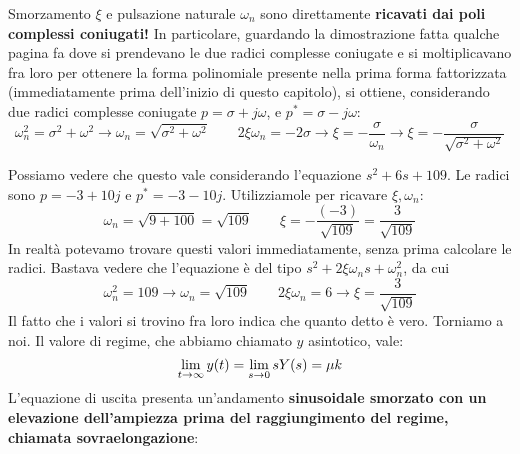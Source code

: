 \begin{defin}{}{}
Smorzamento $\xi$ e pulsazione naturale $\omega_n$ sono direttamente \textbf{ricavati dai poli complessi coniugati!} In particolare, guardando la dimostrazione fatta qualche pagina fa dove si prendevano le due radici complesse coniugate e si moltiplicavano fra loro per ottenere la forma polinomiale presente nella prima forma fattorizzata (immediatamente prima dell'inizio di questo capitolo), si ottiene, considerando due radici complesse coniugate $p = \sigma + j\omega$, e $p^* = \sigma - j\omega$: 
\begin{equation}
 \omega_n^2 = \sigma^2 + \omega^2 \rightarrow \boxed{\omega_n = \sqrt{\sigma^2 + \omega^2}} \quad \quad 2\xi \omega_{n} = -2\sigma \rightarrow \xi = -\frac{\sigma}{\omega_n} \rightarrow \boxed{\xi = -\frac{\sigma}{\sqrt{\sigma^2+\omega^2}}}
\end{equation}
\end{defin}
Possiamo vedere che questo vale considerando l'equazione $s^2 + 6s + 109$. Le radici sono $p = -3 + 10j$ e $p^* = -3 -10 j$. Utilizziamole per ricavare $\xi, \omega_n$:
\begin{equation*}
\omega_n = \sqrt{9+100} = \sqrt{109} \quad \quad \xi = -\frac{(-3)}{\sqrt{109}} = \frac{3}{\sqrt{109}}
\end{equation*}
In realtà potevamo trovare questi valori immediatamente, senza prima calcolare le radici. Bastava vedere che l'equazione è del tipo $s^2 + 2\xi\omega_n s + \omega_n^2$, da cui
\begin{equation*}
\omega_n^2 = 109 \rightarrow \omega_n = \sqrt{109} \quad \quad 2\xi\omega_n = 6 \rightarrow \xi = \frac{3}{\sqrt{109}}
\end{equation*}
Il fatto che i valori si trovino fra loro indica che quanto detto è vero.
\starbreak
Torniamo a noi.
Il valore di regime, che abbiamo chiamato $y$ asintotico, vale:
\begin{equation}
\lim_{t \rightarrow \infty} y(t) = \lim_{s \rightarrow 0} sY(s) = \mu k
\end{equation}
L'equazione di uscita presenta un'andamento \textbf{sinusoidale smorzato con un elevazione dell'ampiezza prima del raggiungimento del regime, chiamata sovraelongazione}:

